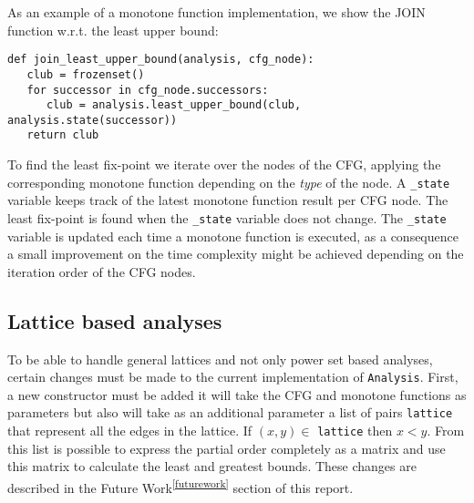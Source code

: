 As an example of a monotone function implementation, we show the JOIN function w.r.t. the least upper bound: 
\begin{verbatim}
def join_least_upper_bound(analysis, cfg_node):
   club = frozenset()
   for successor in cfg_node.successors:
      club = analysis.least_upper_bound(club, analysis.state(successor))
   return club
\end{verbatim}

\newpar To find the least fix-point we iterate over the nodes of the CFG, applying the corresponding monotone function depending on the \emph{type} of the node. A \texttt{\_state} variable keeps track of the latest monotone function result per CFG node. The least fix-point is found when the \texttt{\_state} variable does not change. The \texttt{\_state} variable is updated each time a monotone function is executed, as a consequence a small improvement on the time complexity might be achieved depending on the iteration order of the CFG nodes.

\subsection{Lattice based analyses}
To be able to handle general lattices and not only power set based analyses, certain changes must be made to the current implementation of \texttt{Analysis}. First, a new constructor must be added it will take the CFG and monotone functions as parameters but also will take as an additional parameter a list of pairs \texttt{lattice} that represent all the edges in the lattice. If $(x,y) \in$ \texttt{lattice} then $x < y$. From this list is possible to express the partial order completely as a matrix and use this matrix to calculate the least and greatest bounds. These changes are described in the Future Work\textsuperscript{\ref{futurework}} section of this report. 


